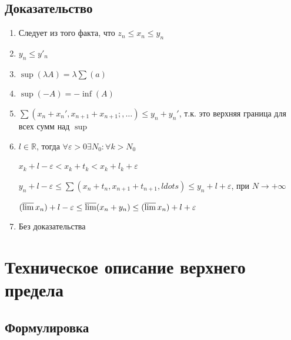 \documentclass{article}
\begin{document}
        \subsection{Доказательство}
        
            \begin{enumerate}
            
                \item Следует из того факта, что $z_n \leq x_n \leq y_n$
                
                \item $y_n \leq y'_n$
                
                \item $\sup(\lambda A) = \lambda \sum(a)$
                
                \item $\sup(-A) = -\inf(A)$
                
                \item $\sum(x_n + x_n', x_{n + 1} + x_{n + 1};, \ldots) \leq y_n + y_n'$, т.к. это верхняя граница для всех сумм над $\sup$
                
                \item $l \in \mathbb{R}$, тогда $\forall \varepsilon > 0 \exists N_0: \forall k > N_0$
                
                    $x_k + l - \varepsilon < x_k + t_k < x_k + l_k + \varepsilon$
                    
                    $y_n + l - \varepsilon \leq \sum(x_n + t_n, x_{n + 1} + t_{n + 1}, ldots) \leq y_n + l + \varepsilon$, при $N \rightarrow +\infty$
                    
                    $(\varlimsup x_n) + l - \varepsilon \leq \varlimsup (x_n + y_n) \leq (\varlimsup x_n) + l + \varepsilon$
                    
                \item Без доказательства
                
            \end{enumerate}
            
    \newpage
    
    \section{Техническое описание верхнего предела}
    
        \subsection{Формулировка}
        
\end{document}
